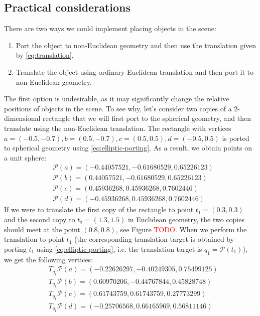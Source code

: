 \subsection{Practical considerations} %
There are two ways we could implement placing objects in the scene:
\begin{enumerate}
    \item Port the object to non-Euclidean geometry and then use the translation given by \autoref{eq:translation},
    \item Translate the object using ordinary Euclidean translation and then port it to non-Euclidean geometry.
\end{enumerate}
The first option is undesirable, as it may significantly change the relative positions of objects in the scene.
To see why, let's consider two copies of a 2-dimensional rectangle that we will first port to the spherical geometry, and then translate using the non-Euclidean translation.
The rectangle with vertices $a = (-0.5, -0.7), b = (0.5, -0.7), c = (0.5, 0.5), d = (-0.5, 0.5)$ is ported to spherical geometry using \autoref{eq:elliptic-porting}.
As a result, we obtain points on a unit sphere:
\begin{equation*}
    \begin{split}
         & \mathcal{P}(a) = (-0.44057521, -0.61680529,  0.65226123) \\
         & \mathcal{P}(b) =( 0.44057521, -0.61680529,  0.65226123)  \\
         & \mathcal{P}(c) =(0.45936268, 0.45936268, 0.7602446 )     \\
         & \mathcal{P}(d) =(-0.45936268,  0.45936268,  0.7602446 )
    \end{split}
\end{equation*}
If we were to translate the first copy of the rectangle to point $t_1 = (0.3, 0.3)$ and the second copy to $t _2 = (1.3, 1.5)$ in Euclidean geometry, the two copies should meet at the point $(0.8, 0.8)$, see Figure \textcolor{red}{TODO}.
When we perform the translation to point $t_1$ (the corresponding translation target is obtained by porting $t_1$ using \autoref{eq:elliptic-porting}, i.e. the translation target is $q_1 = \mathcal{P}(t_1)$), we get the following vertices:
\begin{equation*}
    \begin{split}
         & T_{q_1}\mathcal{P}(a) =  (-0.22626297, -0.40249305,  0.75499125) \\
         & T_{q_1}\mathcal{P}(b) = ( 0.60970206, -0.44767844,  0.45828748)  \\
         & T_{q_1}\mathcal{P}(c) =(0.61743759, 0.61743759, 0.27773299)      \\
         & T_{q_1}\mathcal{P}(d) =(-0.25706568,  0.66165969,  0.56811146)
    \end{split}
\end{equation*}

